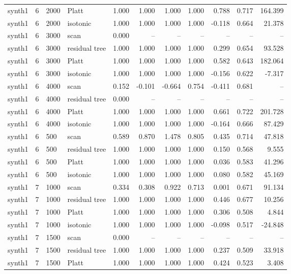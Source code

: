 \begin{tabular}{lrllrrrrrrr}
synth1 & 6 & 2000 & Platt & 1.000 & 1.000 & 1.000 & 1.000 & 0.788 & 0.717 & 164.399 \\
synth1 & 6 & 2000 & isotonic & 1.000 & 1.000 & 1.000 & 1.000 & -0.118 & 0.664 & 21.378 \\
synth1 & 6 & 3000 & scan & 0.000 & -- & -- & -- & -- & -- & -- \\
synth1 & 6 & 3000 & residual tree & 1.000 & 1.000 & 1.000 & 1.000 & 0.299 & 0.654 & 93.528 \\
synth1 & 6 & 3000 & Platt & 1.000 & 1.000 & 1.000 & 1.000 & 0.582 & 0.643 & 182.064 \\
synth1 & 6 & 3000 & isotonic & 1.000 & 1.000 & 1.000 & 1.000 & -0.156 & 0.622 & -7.317 \\
synth1 & 6 & 4000 & scan & 0.152 & -0.101 & -0.664 & 0.754 & -0.411 & 0.681 & -- \\
synth1 & 6 & 4000 & residual tree & 0.000 & -- & -- & -- & -- & -- & -- \\
synth1 & 6 & 4000 & Platt & 1.000 & 1.000 & 1.000 & 1.000 & 0.661 & 0.722 & 201.728 \\
synth1 & 6 & 4000 & isotonic & 1.000 & 1.000 & 1.000 & 1.000 & -0.164 & 0.666 & 87.429 \\
synth1 & 6 & 500 & scan & 0.589 & 0.870 & 1.478 & 0.805 & 0.435 & 0.714 & 47.818 \\
synth1 & 6 & 500 & residual tree & 1.000 & 1.000 & 1.000 & 1.000 & 0.150 & 0.568 & 9.555 \\
synth1 & 6 & 500 & Platt & 1.000 & 1.000 & 1.000 & 1.000 & 0.036 & 0.583 & 41.296 \\
synth1 & 6 & 500 & isotonic & 1.000 & 1.000 & 1.000 & 1.000 & 0.080 & 0.582 & 45.169 \\
synth1 & 7 & 1000 & scan & 0.334 & 0.308 & 0.922 & 0.713 & 0.001 & 0.671 & 91.134 \\
synth1 & 7 & 1000 & residual tree & 1.000 & 1.000 & 1.000 & 1.000 & 0.446 & 0.677 & 10.256 \\
synth1 & 7 & 1000 & Platt & 1.000 & 1.000 & 1.000 & 1.000 & 0.306 & 0.508 & 4.844 \\
synth1 & 7 & 1000 & isotonic & 1.000 & 1.000 & 1.000 & 1.000 & -0.098 & 0.517 & -24.848 \\
synth1 & 7 & 1500 & scan & 0.000 & -- & -- & -- & -- & -- & -- \\
synth1 & 7 & 1500 & residual tree & 1.000 & 1.000 & 1.000 & 1.000 & 0.237 & 0.509 & 33.918 \\
synth1 & 7 & 1500 & Platt & 1.000 & 1.000 & 1.000 & 1.000 & 0.424 & 0.523 & 3.408 \\

\end{tabular}
